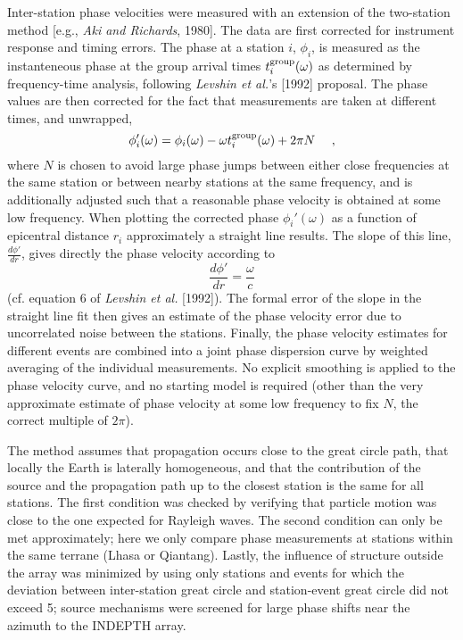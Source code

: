 \documentclass[12pt]{article}
\begin{document}
Inter-station phase velocities were measured with an extension of the two-station method [e.g., {\it Aki
and Richards}, 1980]. The data are first corrected for instrument response and timing errors. The phase at
a station $i$, $\phi_i$, is measured as the instanteneous phase at the group arrival times $t^{\rm
group}_i(\omega)$ as determined by frequency-time analysis, following {\it Levshin et al.}'s [1992]
proposal.  The phase values are then corrected for the fact that measurements are taken at different times,
and unwrapped,
 \begin{displaymath}
\phi_i'(\omega)=\phi_i(\omega)-\omega t^{\rm group}_i(\omega)+2\pi N \ \ \ \ ,
\end{displaymath}
where $N$ is chosen to avoid large phase jumps between either close frequencies at
the same station or between nearby stations at the same frequency, and
is additionally adjusted such that a
reasonable phase velocity is obtained at some low frequency.  When plotting the corrected phase
$\phi_i'(\omega)$ as a function of epicentral distance $r_i$ approximately a straight line results.  The
slope of this line, $\frac{d\phi'}{dr}$, gives directly the phase velocity according to \begin{displaymath}
\frac{d\phi'}{dr}=\frac{\omega}{c} \end{displaymath} (cf. equation 6 of {\it Levshin et al.} [1992]). The
formal error of the slope in the straight line fit then gives an estimate of the phase velocity error due
to uncorrelated noise between the stations.  Finally, the phase velocity estimates for different events are
combined into a joint phase dispersion curve by weighted averaging of the individual measurements.  No
explicit smoothing is applied to the phase velocity curve, and no starting model is required (other than
the very approximate estimate of phase velocity at some low frequency to fix $N$, the correct multiple of
$2\pi$).

The method assumes that propagation occurs close to the great circle path, that locally the Earth is
laterally homogeneous, and that the contribution of the source and the propagation path up to the closest
station is the same for all stations.  The first condition was checked by verifying that particle motion
was close to the one expected for Rayleigh waves.  The second condition can only be met approximately; here
we only compare phase measurements at stations within the same terrane (Lhasa or Qiantang).  Lastly, the
influence of structure outside the array was minimized by using only stations and events for which the
deviation between inter-station great circle and station-event great circle did not exceed 5\dg; source
mechanisms were screened for large phase shifts near the azimuth to the INDEPTH array.
\end{document}
